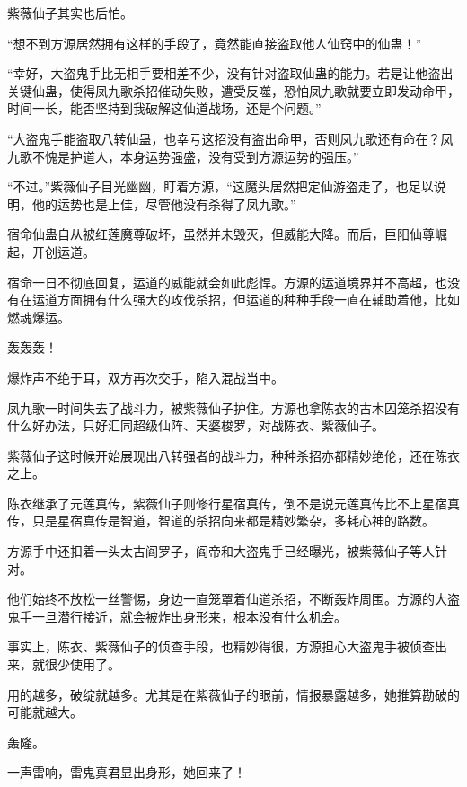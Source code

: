 \begin{this_body}
紫薇仙子其实也后怕。

“想不到方源居然拥有这样的手段了，竟然能直接盗取他人仙窍中的仙蛊！”

“幸好，大盗鬼手比无相手要相差不少，没有针对盗取仙蛊的能力。若是让他盗出关键仙蛊，使得凤九歌杀招催动失败，遭受反噬，恐怕凤九歌就要立即发动命甲，时间一长，能否坚持到我破解这仙道战场，还是个问题。”

“大盗鬼手能盗取八转仙蛊，也幸亏这招没有盗出命甲，否则凤九歌还有命在？凤九歌不愧是护道人，本身运势强盛，没有受到方源运势的强压。”

“不过。”紫薇仙子目光幽幽，盯着方源，“这魔头居然把定仙游盗走了，也足以说明，他的运势也是上佳，尽管他没有杀得了凤九歌。”

宿命仙蛊自从被红莲魔尊破坏，虽然并未毁灭，但威能大降。而后，巨阳仙尊崛起，开创运道。

宿命一日不彻底回复，运道的威能就会如此彪悍。方源的运道境界并不高超，也没有在运道方面拥有什么强大的攻伐杀招，但运道的种种手段一直在辅助着他，比如燃魂爆运。

轰轰轰！

爆炸声不绝于耳，双方再次交手，陷入混战当中。

凤九歌一时间失去了战斗力，被紫薇仙子护住。方源也拿陈衣的古木囚笼杀招没有什么好办法，只好汇同超级仙阵、天婆梭罗，对战陈衣、紫薇仙子。

紫薇仙子这时候开始展现出八转强者的战斗力，种种杀招亦都精妙绝伦，还在陈衣之上。

陈衣继承了元莲真传，紫薇仙子则修行星宿真传，倒不是说元莲真传比不上星宿真传，只是星宿真传是智道，智道的杀招向来都是精妙繁杂，多耗心神的路数。

方源手中还扣着一头太古阎罗子，阎帝和大盗鬼手已经曝光，被紫薇仙子等人针对。

他们始终不放松一丝警惕，身边一直笼罩着仙道杀招，不断轰炸周围。方源的大盗鬼手一旦潜行接近，就会被炸出身形来，根本没有什么机会。

事实上，陈衣、紫薇仙子的侦查手段，也精妙得很，方源担心大盗鬼手被侦查出来，就很少使用了。

用的越多，破绽就越多。尤其是在紫薇仙子的眼前，情报暴露越多，她推算勘破的可能就越大。

轰隆。

一声雷响，雷鬼真君显出身形，她回来了！

\end{this_body}

